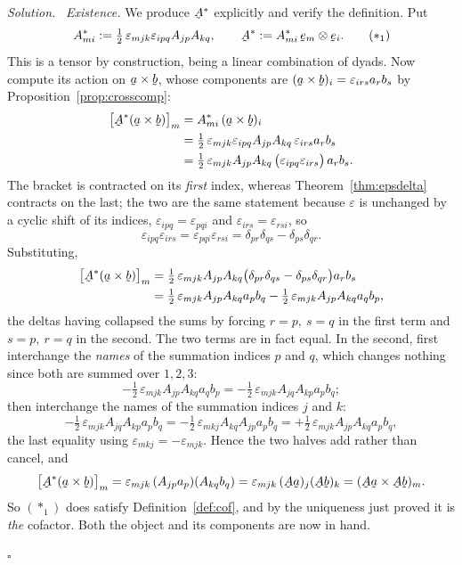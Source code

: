 \documentclass[17pt,a4paper]{extreport}
\DeclareRobustCommand{\vek}[1]{\underaccent{\tilde}{#1}}
\newcommand{\ba}{\vek{a}}
\newcommand{\bb}{\vek{b}}
\newcommand{\be}{\vek{e}}
\newcommand{\bA}{\vek{A}}
\newcommand{\dd}{\delta}
\newcommand{\eps}{\varepsilon}
\theoremstyle{scplain}
\theoremstyle{scdefn}
\theoremstyle{scplain}
\newenvironment{solution}
 {\par\smallskip\noindent\textit{Solution.}\ }
 {\hfill$\square$\par\medskip}
\begin{document}
\begin{solution}
\emph{Existence.} We produce $\bA^{*}$ explicitly and verify the definition.
Put
\begin{equation}
   A^{*}_{mi}:=\tfrac12\,\eps_{mjk}\eps_{ipq}A_{jp}A_{kq},
   \qquad \bA^{*}:=A^{*}_{mi}\,\be_{m}\otimes\be_{i}. \tag{$\ast_1$}
\end{equation}
This is a tensor by construction, being a linear combination of dyads. Now
compute its action on $\ba\times\bb$, whose components are
$(\ba\times\bb)_{i}=\eps_{irs}a_{r}b_{s}$ by
Proposition~\ref{prop:crosscomp}:
\[
\begin{aligned}
   \big[\bA^{*}(\ba\times\bb)\big]_{m}
   &=A^{*}_{mi}\,(\ba\times\bb)_{i}\\
   &=\tfrac12\,\eps_{mjk}\eps_{ipq}A_{jp}A_{kq}\,\eps_{irs}a_{r}b_{s}\\
   &=\tfrac12\,\eps_{mjk}A_{jp}A_{kq}\,
     \big(\eps_{ipq}\eps_{irs}\big)\,a_{r}b_{s}.
\end{aligned}
\]
The bracket is contracted on its \emph{first} index, whereas
Theorem~\ref{thm:epsdelta} contracts on the last; the two are the same
statement because $\eps$ is unchanged by a cyclic shift of its indices,
$\eps_{ipq}=\eps_{pqi}$ and $\eps_{irs}=\eps_{rsi}$, so
\[
   \eps_{ipq}\eps_{irs}=\eps_{pqi}\eps_{rsi}
   =\dd_{pr}\dd_{qs}-\dd_{ps}\dd_{qr}.
\]
Substituting,
\[
\begin{aligned}
   \big[\bA^{*}(\ba\times\bb)\big]_{m}
   &=\tfrac12\,\eps_{mjk}A_{jp}A_{kq}
     \big(\dd_{pr}\dd_{qs}-\dd_{ps}\dd_{qr}\big)a_{r}b_{s}\\
   &=\tfrac12\,\eps_{mjk}A_{jp}A_{kq}a_{p}b_{q}
    -\tfrac12\,\eps_{mjk}A_{jp}A_{kq}a_{q}b_{p},
\end{aligned}
\]
the deltas having collapsed the sums by forcing $r=p,\ s=q$ in the first
term and $s=p,\ r=q$ in the second. The two terms are in fact equal. In the
second, first interchange the \emph{names} of the summation indices $p$ and
$q$, which changes nothing since both are summed over $1,2,3$:
\[
   -\tfrac12\,\eps_{mjk}A_{jp}A_{kq}a_{q}b_{p}
   =-\tfrac12\,\eps_{mjk}A_{jq}A_{kp}a_{p}b_{q};
\]
then interchange the names of the summation indices $j$ and $k$:
\[
   -\tfrac12\,\eps_{mjk}A_{jq}A_{kp}a_{p}b_{q}
   =-\tfrac12\,\eps_{mkj}A_{kq}A_{jp}a_{p}b_{q}
   =+\tfrac12\,\eps_{mjk}A_{jp}A_{kq}a_{p}b_{q},
\]
the last equality using $\eps_{mkj}=-\eps_{mjk}$. Hence the two halves add
rather than cancel, and
\[
   \big[\bA^{*}(\ba\times\bb)\big]_{m}
   =\eps_{mjk}\,(A_{jp}a_{p})(A_{kq}b_{q})
   =\eps_{mjk}\,(\bA\ba)_{j}(\bA\bb)_{k}
   =(\bA\ba\times\bA\bb)_{m}.
\]
So $(\ast_1)$ does satisfy Definition~\ref{def:cof}, and by the uniqueness
just proved it is \emph{the} cofactor. Both the object and its components
are now in hand.


\end{solution}
\end{document}
